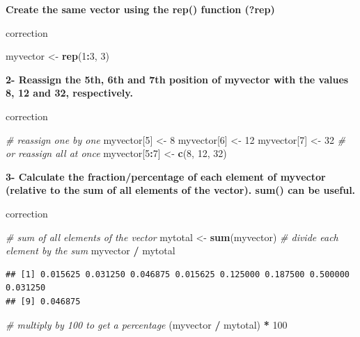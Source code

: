 \documentclass[]{book}
\newenvironment{Shaded}{\begin{snugshade}}{\end{snugshade}}
\newcommand{\CommentTok}[1]{\textcolor[rgb]{0.56,0.35,0.01}{\textit{#1}}}
\newcommand{\DecValTok}[1]{\textcolor[rgb]{0.00,0.00,0.81}{#1}}
\newcommand{\KeywordTok}[1]{\textcolor[rgb]{0.13,0.29,0.53}{\textbf{#1}}}
\newcommand{\NormalTok}[1]{#1}
\newcommand{\OperatorTok}[1]{\textcolor[rgb]{0.81,0.36,0.00}{\textbf{#1}}}
\newcommand{\StringTok}[1]{\textcolor[rgb]{0.31,0.60,0.02}{#1}}
\begin{document}
\textbf{Create the same vector using the rep() function (?rep)}

correction

\begin{Shaded}
\begin{Highlighting}[]
\NormalTok{myvector <-}\StringTok{ }\KeywordTok{rep}\NormalTok{(}\DecValTok{1}\OperatorTok{:}\DecValTok{3}\NormalTok{, }\DecValTok{3}\NormalTok{)}
\end{Highlighting}
\end{Shaded}

\textbf{2- Reassign the 5th, 6th and 7th position of myvector with the values 8, 12 and 32, respectively.}

correction

\begin{Shaded}
\begin{Highlighting}[]
\CommentTok{# reassign one by one}
\NormalTok{myvector[}\DecValTok{5}\NormalTok{] <-}\StringTok{ }\DecValTok{8}
\NormalTok{myvector[}\DecValTok{6}\NormalTok{] <-}\StringTok{ }\DecValTok{12}
\NormalTok{myvector[}\DecValTok{7}\NormalTok{] <-}\StringTok{ }\DecValTok{32}
\CommentTok{# or reassign all at once}
\NormalTok{myvector[}\DecValTok{5}\OperatorTok{:}\DecValTok{7}\NormalTok{] <-}\StringTok{ }\KeywordTok{c}\NormalTok{(}\DecValTok{8}\NormalTok{, }\DecValTok{12}\NormalTok{, }\DecValTok{32}\NormalTok{)}
\end{Highlighting}
\end{Shaded}

\textbf{3- Calculate the fraction/percentage of each element of myvector (relative to the sum of all elements of the vector).
sum() can be useful.}

correction

\begin{Shaded}
\begin{Highlighting}[]
\CommentTok{# sum of all elements of the vector}
\NormalTok{mytotal <-}\StringTok{ }\KeywordTok{sum}\NormalTok{(myvector)}
\CommentTok{# divide each element by the sum}
\NormalTok{myvector }\OperatorTok{/}\StringTok{ }\NormalTok{mytotal}
\end{Highlighting}
\end{Shaded}

\begin{verbatim}
## [1] 0.015625 0.031250 0.046875 0.015625 0.125000 0.187500 0.500000 0.031250
## [9] 0.046875
\end{verbatim}

\begin{Shaded}
\begin{Highlighting}[]
\CommentTok{# multiply by 100 to get a percentage}
\NormalTok{(myvector }\OperatorTok{/}\StringTok{ }\NormalTok{mytotal) }\OperatorTok{*}\StringTok{ }\DecValTok{100}
\end{Highlighting}
\end{Shaded}
\end{document}
